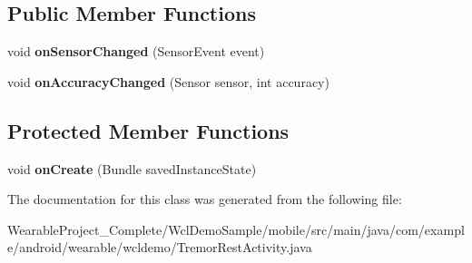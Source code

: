 \subsection*{Public Member Functions}
\begin{DoxyCompactItemize}
\item 
void {\bfseries on\+Sensor\+Changed} (Sensor\+Event event)\hypertarget{classcom_1_1example_1_1android_1_1wearable_1_1wcldemo_1_1TremorRestActivity_ad5fc559308909e8abca3396b2fd74c42}{}\label{classcom_1_1example_1_1android_1_1wearable_1_1wcldemo_1_1TremorRestActivity_ad5fc559308909e8abca3396b2fd74c42}

\item 
void {\bfseries on\+Accuracy\+Changed} (Sensor sensor, int accuracy)\hypertarget{classcom_1_1example_1_1android_1_1wearable_1_1wcldemo_1_1TremorRestActivity_a48974265400b02f507d2e59400d606d7}{}\label{classcom_1_1example_1_1android_1_1wearable_1_1wcldemo_1_1TremorRestActivity_a48974265400b02f507d2e59400d606d7}

\end{DoxyCompactItemize}
\subsection*{Protected Member Functions}
\begin{DoxyCompactItemize}
\item 
void {\bfseries on\+Create} (Bundle saved\+Instance\+State)\hypertarget{classcom_1_1example_1_1android_1_1wearable_1_1wcldemo_1_1TremorRestActivity_a0afcef3dcbfa18852f8e0512dc3debeb}{}\label{classcom_1_1example_1_1android_1_1wearable_1_1wcldemo_1_1TremorRestActivity_a0afcef3dcbfa18852f8e0512dc3debeb}

\end{DoxyCompactItemize}


The documentation for this class was generated from the following file\+:\begin{DoxyCompactItemize}
\item 
Wearable\+Project\+\_\+\+Complete/\+Wcl\+Demo\+Sample/mobile/src/main/java/com/example/android/wearable/wcldemo/Tremor\+Rest\+Activity.\+java\end{DoxyCompactItemize}
